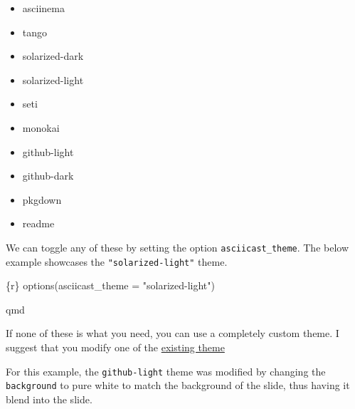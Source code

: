 \documentclass[
  letterpaper,
  DIV=11,
  numbers=noendperiod]{scrreprt}
\newenvironment{Shaded}{\begin{snugshade}}{\end{snugshade}}
\newcommand{\InformationTok}[1]{\textcolor[rgb]{0.37,0.37,0.37}{#1}}
\providecommand{\tightlist}{%
  \setlength{\itemsep}{0pt}\setlength{\parskip}{0pt}}\usepackage{longtable,booktabs,array}
\begin{document}
\begin{itemize}
\tightlist
\item
  asciinema
\item
  tango
\item
  solarized-dark
\item
  solarized-light
\item
  seti
\item
  monokai
\item
  github-light
\item
  github-dark
\item
  pkgdown
\item
  readme
\end{itemize}

We can toggle any of these by setting the option
\texttt{asciicast\_theme}. The below example showcases the
\texttt{"solarized-light"} theme.

\begin{Shaded}
\begin{Highlighting}[]
\InformationTok{\textasciigrave{}\textasciigrave{}\textasciigrave{}\{r\}}
\InformationTok{options(asciicast\_theme = "solarized{-}light")}
\InformationTok{\textasciigrave{}\textasciigrave{}\textasciigrave{}}
\end{Highlighting}
\end{Shaded}

qmd

If none of these is what you need, you can use a completely custom
theme. I suggest that you modify one of the
\href{https://github.com/r-lib/asciicast/blob/4e6302182264a0fe7c58c427c9878b9135dac4fd/R/svg.R\#L190}{existing
theme}

For this example, the \texttt{github-light} theme was modified by
changing the \texttt{background} to pure white to match the background
of the slide, thus having it blend into the slide.
\end{document}
